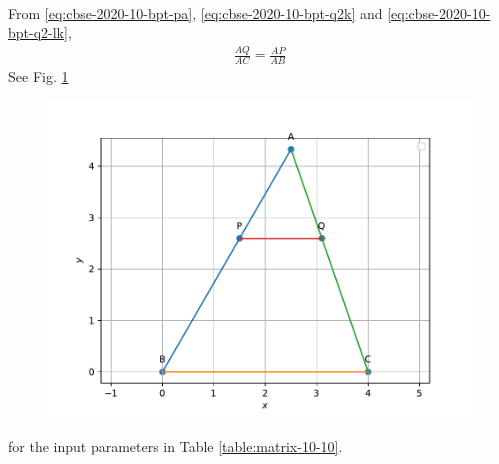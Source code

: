 \documentclass[journal,12pt,twocolumn]{IEEEtran}
\begin{document}
\begin{enumerate}
\begin{align}
		\end{align}
		From 
			\eqref{eq:cbse-2020-10-bpt-pa},  
			\eqref{eq:cbse-2020-10-bpt-q2k} and
			\eqref{eq:cbse-2020-10-bpt-q2-lk},
			\begin{align}
				\frac{AQ}{AC} = \frac{AP}{AB}
			\end{align}
    See Fig. 
	  \ref{fig:matrix-10-10.pdf}
  \begin{figure}
	  \centering 
	  \includegraphics[width=\columnwidth]{figs/matrix-10-10.pdf}
	  \caption{}
	  \label{fig:matrix-10-10.pdf}
	  \end{figure}
	  for the input parameters in  Table
\ref{table:matrix-10-10}.	
\begin{table}[ht!]
	
\caption{}
\label{table:matrix-10-10}	
\end{table}
		

\end{enumerate}
\end{document}

